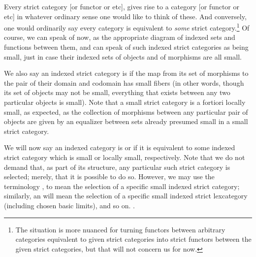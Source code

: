 Every strict category [or functor or etc], gives rise to a category [or functor or etc] in whatever ordinary sense one would like to think of these. And conversely, one would ordinarily say every category is equivalent to \emph{some} strict category.\footnote{The situation is more nuanced for turning functors between arbitrary categories equivalent to given strict categories into strict functors between the given strict categories, but that will not concern us for now.} Of course, we can speak of  now, as the appropriate diagram of indexed sets and functions between them, and can speak of such indexed strict categories as being small, just in case their indexed sets of objects and of morphisms are all small.

We also say an indexed strict category is  if the map from its set of morphisms to the pair of their domain and codomain has small fibers (in other words, though its set of objects may not be small, everything that exists between any two particular objects is small). Note that a small strict category is a fortiori locally small, as expected, as the collection of morphisms between any particular pair of objects are given by an equalizer between sets already presumed small in a small strict category.

We will now say an indexed category is  or  if it is equivalent to some indexed strict category which is small or locally small, respectively. Note that we do not demand that, as part of its structure, any particular such strict category is selected; merely, that it is possible to do so. However, we may use the terminology , to mean the selection of a specific small indexed strict category; similarly, an  will mean the selection of a specific small indexed strict lexcategory (including chosen basic limits), and so on. .

